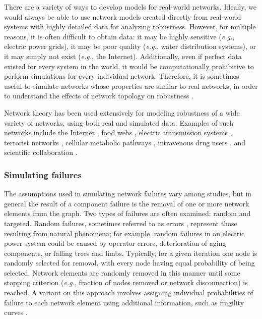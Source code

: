 There are a variety of ways to develop models for real-world networks. Ideally, we would always be able to use network models created directly from real-world systems with highly detailed data for analyzing robustness.  However, for multiple reasons, it is often difficult to obtain data: it may be highly sensitive (\emph{e.g.}, electric power grids), it may be poor quality (\emph{e.g.}, water distribution systems), or it may simply not exist (\emph{e.g.}, the Internet).  Additionally, even if perfect data existed for every system in the world, it would be computationally prohibitive to perform simulations for every individual network.  Therefore, it is sometimes useful to simulate networks whose properties are similar to real networks, in order to understand the effects of network topology on robustness \cite{Albert2000,Crucitti2004a,Duenas-Osorio2009,Estrada2006,Holme2002,Holmgren2006a,Motter2002a,Motter2002b,Pepyne2007}.

Network theory has been used extensively for modeling robustness of a wide variety of networks, using both real and simulated data.  Examples of such networks include the Internet \cite{Motter2002a, Crucitti2004a}, food webs \cite{Sole2001, Montoya2006, Estrada2006}, electric transmission systems \cite{Motter2002a, Albert2004, Crucitti2004a, Kinney2005, Holmgren2006a, Pepyne2007, Rosas-Casals2007, Shoji2009, Simonsen2008, Duenas-Osorio2009, Winkler2010}, terrorist networks \cite{Qin2005, Shaikh2007}, cellular metabolic pathways \cite{Jeong2000, Jeong2001}, intravenous drug users \cite{Estrada2006}, and scientific collaboration \cite{Barabasi2002, Holme2002}.


\subsubsection{Simulating failures}

The assumptions used in simulating network failures vary among studies, but in general the result of a component failure is the removal of one or more network elements from the graph.  Two types of failures are often examined: random and targeted.  Random failures, sometimes referred to as errors \cite{Albert2000}, represent those resulting from natural phenomena; for example, random failures in an electric power system could be caused by operator errors, deterioration of aging components, or falling trees and limbs.  Typically, for a given iteration one node is randomly selected for removal, with every node having equal probability of being selected.  Network elements are randomly removed in this manner until some stopping criterion (\emph{e.g.}, fraction of nodes removed or network disconnection) is reached.  A variant on this approach involves assigning individual probabilities of failure to each network element using additional information, such as fragility curves \cite{Duenas-Osorio2009, Winkler2010}.

